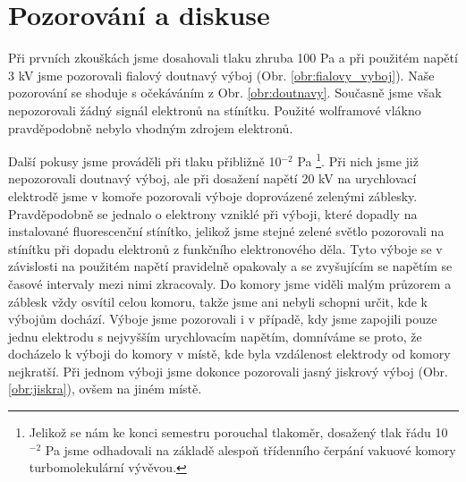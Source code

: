 \section{Pozorování a diskuse}
\par Při prvních zkouškách jsme dosahovali tlaku zhruba 100 Pa a při použitém napětí 3 kV jsme pozorovali fialový doutnavý výboj (Obr. \ref{obr:fialovy_vyboj}). Naše pozorování se shoduje s očekáváním z Obr. \ref{obr:doutnavy}. Současně jsme však nepozorovali žádný signál elektronů na stínítku. Použité wolframové vlákno pravděpodobně nebylo vhodným zdrojem elektronů. 
\par Další pokusy jsme prováděli při tlaku přibližně 10$^{-2}$ Pa \footnote{Jelikož se nám ke konci semestru porouchal tlakoměr, dosažený tlak řádu 10$^{-2}$ Pa jsme odhadovali na základě alespoň třídenního čerpání vakuové komory turbomolekulární vývěvou. }. Při nich jsme již nepozorovali doutnavý výboj, ale při dosažení napětí 20 kV na urychlovací elektrodě jsme v komoře pozorovali výboje doprovázené zelenými záblesky. Pravděpodobně se jednalo o elektrony vzniklé při výboji, které dopadly na instalované fluorescenční stínítko, jelikož jsme stejné zelené světlo pozorovali na stínítku při dopadu elektronů z funkčního elektronového děla. Tyto výboje se v závislosti na použitém napětí pravidelně opakovaly a se zvyšujícím se napětím se časové intervaly mezi nimi zkracovaly. Do komory jsme viděli malým průzorem a záblesk vždy osvítil celou komoru, takže jsme ani nebyli schopni určit, kde k výbojům dochází. Výboje jsme pozorovali i v případě, kdy jsme zapojili pouze jednu elektrodu s nejvyšším urychlovacím napětím, domníváme se proto, že docházelo k výboji do komory v místě, kde byla vzdálenost elektrody od komory nejkratší. Při jednom výboji jsme dokonce pozorovali jasný jiskrový výboj (Obr. \ref{obr:jiskra}), ovšem na jiném místě.

